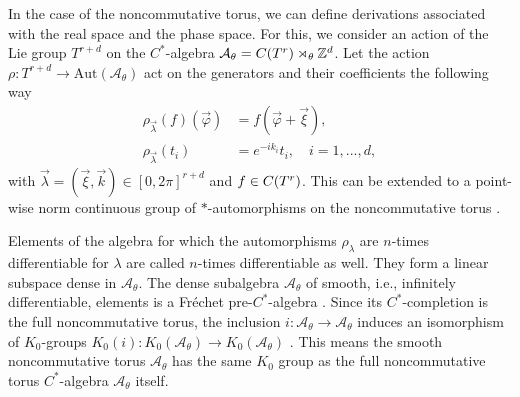 \documentclass[submission, Phys]{SciPost}
\begin{document}
In the case of the noncommutative torus, we can define derivations associated with the real space and the phase space.
For this, we consider an action of the Lie group $T^{r+d}$ on the $C^\ast$-algebra $\mathcal{A}_\theta=C(T^r)\rtimes_\theta \mathbb{Z}^d$. Let the action $\rho: T^{r+d} \to \textrm{Aut}(\mathcal{A}_\theta)$ act on the generators and their coefficients the following way
\begin{align}
    \rho_{\vec{\lambda}}(f)(\vec{\varphi}) &= f(\vec{\varphi}+ \vec{\xi}),\\
    \rho_{\vec{\lambda}}(t_i) &= e^{-ik_i} t_i,\quad i=1,...,d,
\end{align}
with $\vec{\lambda}=(\vec{\xi},\vec{k})\in [0,2\pi]^{r+d}$ and $f\in C(T^r)$.
This can be extended to a point-wise norm continuous group of $\ast$-automorphisms on the noncommutative torus \cite[Prop.~3.10.]{Prodan2017}.

Elements of the algebra for which the automorphisms $\rho_\lambda$ are $n$-times differentiable for $\lambda$ are called $n$-times differentiable as well.
They form a linear subspace dense in $\mathcal{A}_\theta$.
The dense subalgebra $\mathscr{A}_\theta$ of smooth, i.e., infinitely differentiable, elements is a Fr\'echet pre-$C^\ast$-algebra \cite[Prop.~3.45]{Gracia2000}.
Since its $C^*$-completion is the full noncommutative torus, the inclusion $i:\mathscr{A}_\theta\to\mathcal{A}_\theta$ induces an isomorphism of $K_0$-groups $K_0(i): K_0(\mathscr{A}_\theta)\to K_0(\mathcal{A}_\theta)$ \cite[Thm.~3.44]{Gracia2000}. 
This means the smooth noncommutative torus $\mathscr{A}_\theta$ has the same $K_0$ group as the full noncommutative torus $C^\ast$-algebra $\mathcal{A}_\theta$ itself.
\end{document}
